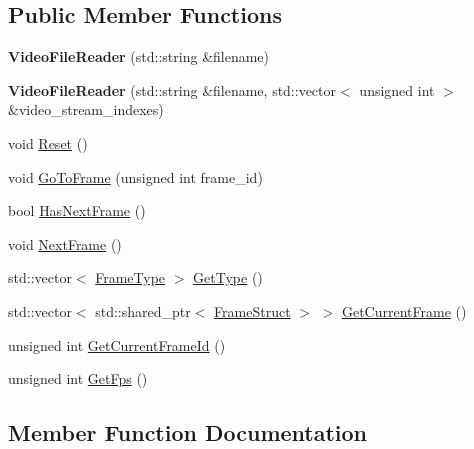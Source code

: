 \subsection*{Public Member Functions}
\begin{DoxyCompactItemize}
\item 
\mbox{\label{classmoetsi_1_1ssp_1_1VideoFileReader_ab878eb4cdb141404d6860d5642157643}} 
{\bfseries Video\+File\+Reader} (std\+::string \&filename)
\item 
\mbox{\label{classmoetsi_1_1ssp_1_1VideoFileReader_a1d13ddb9bea806a1dbf8da68a1f4318b}} 
{\bfseries Video\+File\+Reader} (std\+::string \&filename, std\+::vector$<$ unsigned int $>$ \&video\+\_\+stream\+\_\+indexes)
\item 
void \hyperlink{classmoetsi_1_1ssp_1_1VideoFileReader_ac646d10b57d4e3b3ff4d1c83a47e8c3d}{Reset} ()
\item 
void \hyperlink{classmoetsi_1_1ssp_1_1VideoFileReader_ad98a532db8b1e2c3879df274b2efb082}{Go\+To\+Frame} (unsigned int frame\+\_\+id)
\item 
bool \hyperlink{classmoetsi_1_1ssp_1_1VideoFileReader_ab5733b56b6d6dd7596eac9d914481c7e}{Has\+Next\+Frame} ()
\item 
void \hyperlink{classmoetsi_1_1ssp_1_1VideoFileReader_afdaf5606fd0cfcc2e1b5b7c0fb271ebf}{Next\+Frame} ()
\item 
std\+::vector$<$ \hyperlink{namespacemoetsi_1_1ssp_a46efdfa2cd5a28ead465dcc8006b5a87}{Frame\+Type} $>$ \hyperlink{classmoetsi_1_1ssp_1_1VideoFileReader_a9d47af47299c5fccf766ac2d848a561b}{Get\+Type} ()
\item 
std\+::vector$<$ std\+::shared\+\_\+ptr$<$ \hyperlink{structmoetsi_1_1ssp_1_1FrameStruct}{Frame\+Struct} $>$ $>$ \hyperlink{classmoetsi_1_1ssp_1_1VideoFileReader_a1c4adbf0de8d00d52b36fade1f30baa4}{Get\+Current\+Frame} ()
\item 
unsigned int \hyperlink{classmoetsi_1_1ssp_1_1VideoFileReader_aef5c92da2645cddc7e4ffcfd34ad4b8a}{Get\+Current\+Frame\+Id} ()
\item 
unsigned int \hyperlink{classmoetsi_1_1ssp_1_1VideoFileReader_a83359ad82898acdb75240568b182247c}{Get\+Fps} ()
\end{DoxyCompactItemize}


\subsection{Member Function Documentation}
\mbox{\label{classmoetsi_1_1ssp_1_1VideoFileReader_a1c4adbf0de8d00d52b36fade1f30baa4}} 
